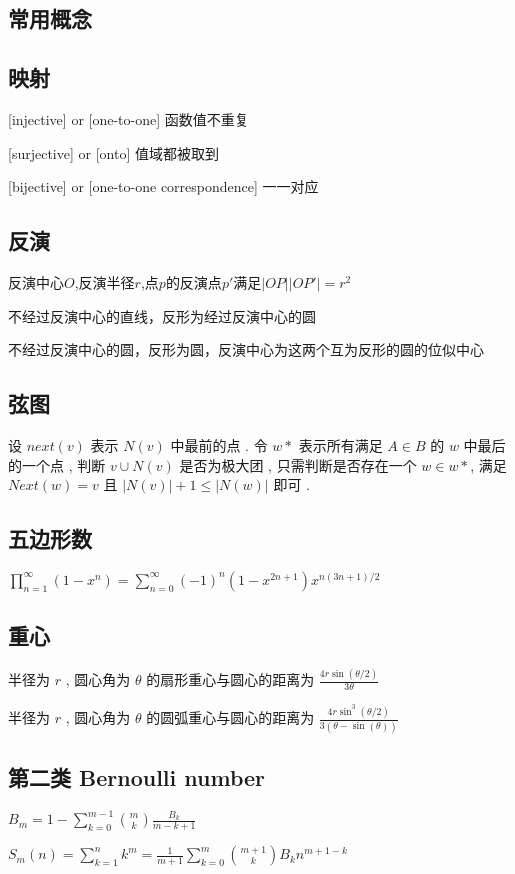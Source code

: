 \subsection{常用概念}
\subsection{映射}
[injective] or [one-to-one] 函数值不重复 \par {[}surjective] or [onto] 值域都被取到 \par {[}bijective] or [one-to-one correspondence] 一一对应
\subsection{反演}
反演中心$O$,反演半径$r$,点$p$的反演点$p'$满足$|OP||OP'|=r^2$\par
不经过反演中心的直线，反形为经过反演中心的圆\par
不经过反演中心的圆，反形为圆，反演中心为这两个互为反形的圆的位似中心\par
\subsection{弦图}
设 $next(v)$ 表示 $N(v)$ 中最前的点 . 
令 $w*$ 表示所有满足 $A \in B$ 的 $w$ 中最后的一个点 , 
判断 $v \cup N(v)$ 是否为极大团 , 
只需判断是否存在一个 $w \in w*$, 
满足 $Next(w)=v$ 且 $|N(v)| + 1 \leq |N(w)|$ 即可 . 
\subsection{五边形数}
$
    \prod_{n=1}^{\infty}{(1-x^{n})}=\sum_{n=0}^{\infty}{(-1)^{n}(1-x^{2n+1})x^{n(3n+1)/2}}
$
\subsection{重心}
半径为 $r$ , 圆心角为 $\theta$ 的扇形重心与圆心的距离为 $\frac{4r\sin(\theta/2)}{3\theta}$ \par
半径为 $r$ , 圆心角为 $\theta$ 的圆弧重心与圆心的距离为 $\frac{4r\sin^3(\theta/2)}{3(\theta-\sin(\theta))}$ \par
\subsection{第二类 Bernoulli number}
$B_m = 1 - \sum_{k=0}^{m-1}{\binom{m}{k}\frac{B_{k}}{m-k+1}}$\par
$S_m(n) = \sum_{k=1}^{n}{k^{m}} = \frac{1}{m+1}\sum_{k=0}^{m}{\binom{m+1}{k}B_{k}n^{m+1-k}}$\par
